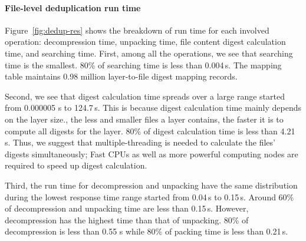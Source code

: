 %

\paragraph{File-level deduplication run time}

%
Figure~\ref{fig:dedup-res} shows the breakdown of run time for each
involved operation: decompression time, unpacking time, file content digest
calculation time, and searching time.
First, among all the operations, we see that searching time is the
smallest. 
%
80\% of searching time is less than 0.004\,s. 
%
The mapping table
maintains 0.98 million layer-to-file digest mapping records. 
%
%
%

Second, we see that digest calculation time spreads over a large range started
from 0.000005 s to 124.7\,s. 
%
This is because digest calculation time mainly
depends on the layer size., \ie the less and smaller files a layer
contains, the faster it is to compute all digests for the layer.
%
%
%
80\% of digest calculation time is less than 4.21\,s. 
%
Thus, we suggest that multiple-threading is needed to calculate the files'
digests simultaneously; 
%
Fast CPUs as well as more powerful computing nodes are
required to speed up digest calculation.

Third, the run time for decompression and unpacking have the same distribution
during the lowest response time range started from 0.04\,s to 0.15\,s. 
%
Around 60\% of decompression and unpacking time are less than 0.15\,s. 
%
However, decompression has the highest time than that of unpacking. 
%
80\% of decompression is less than 0.55 s while 80\% of packing time is less than 0.21\,s. 

